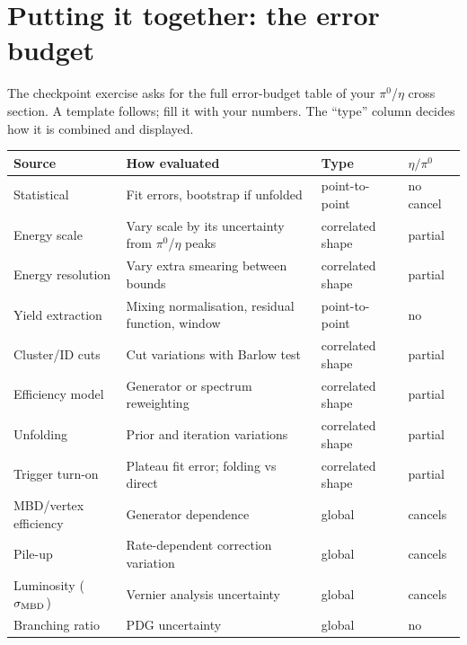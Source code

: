 \documentclass[11pt,letterpaper]{article}
\begin{document}
\section{Putting it together: the error budget}
The checkpoint exercise asks for the full error-budget table of your $\pi^0$/$\eta$ cross section. A template follows; fill it with your
numbers. The ``type'' column decides how it is combined and displayed.
\begin{center}\small
\begin{tabularx}{\linewidth}{@{}lXll@{}}\toprule
Source & How evaluated & Type & $\eta/\pi^0$\\\midrule
Statistical & Fit errors, bootstrap if unfolded & point-to-point & no cancel\\
Energy scale & Vary scale by its uncertainty from $\pi^0$/$\eta$ peaks & correlated shape & partial\\
Energy resolution & Vary extra smearing between bounds & correlated shape & partial\\
Yield extraction & Mixing normalisation, residual function, window & point-to-point & no\\
Cluster/ID cuts & Cut variations with Barlow test & correlated shape & partial\\
Efficiency model & Generator or spectrum reweighting & correlated shape & partial\\
Unfolding & Prior and iteration variations & correlated shape & partial\\
Trigger turn-on & Plateau fit error; folding vs direct & correlated shape & partial\\
MBD/vertex efficiency & Generator dependence & global & cancels\\
Pile-up & Rate-dependent correction variation & global & cancels\\
Luminosity ($\sigma_{\rm MBD}$) & Vernier analysis uncertainty & global & cancels\\
Branching ratio & PDG uncertainty & global & no\\\bottomrule
\end{tabularx}
\end{center}

\end{document}
